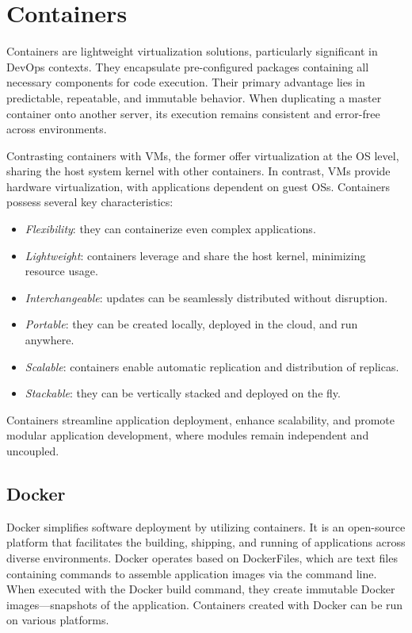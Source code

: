 \section{Containers}

Containers are lightweight virtualization solutions, particularly significant in DevOps contexts.
They encapsulate pre-configured packages containing all necessary components for code execution.
Their primary advantage lies in predictable, repeatable, and immutable behavior.
When duplicating a master container onto another server, its execution remains consistent and error-free across environments.

Contrasting containers with VMs, the former offer virtualization at the OS level, sharing the host system kernel with other containers. 
In contrast, VMs provide hardware virtualization, with applications dependent on guest OSs.
Containers possess several key characteristics:
\begin{itemize}
    \item \textit{Flexibility}: they can containerize even complex applications.
    \item \textit{Lightweight}: containers leverage and share the host kernel, minimizing resource usage.
    \item \textit{Interchangeable}: updates can be seamlessly distributed without disruption.
    \item \textit{Portable}: they can be created locally, deployed in the cloud, and run anywhere.
    \item \textit{Scalable}: containers enable automatic replication and distribution of replicas.
    \item \textit{Stackable}: they can be vertically stacked and deployed on the fly.
\end{itemize}
Containers streamline application deployment, enhance scalability, and promote modular application development, where modules remain independent and uncoupled.

\subsection{Docker}
Docker simplifies software deployment by utilizing containers. 
It is an open-source platform that facilitates the building, shipping, and running of applications across diverse environments.
Docker operates based on DockerFiles, which are text files containing commands to assemble application images via the command line. 
When executed with the Docker build command, they create immutable Docker images—snapshots of the application. 
Containers created with Docker can be run on various platforms. 


